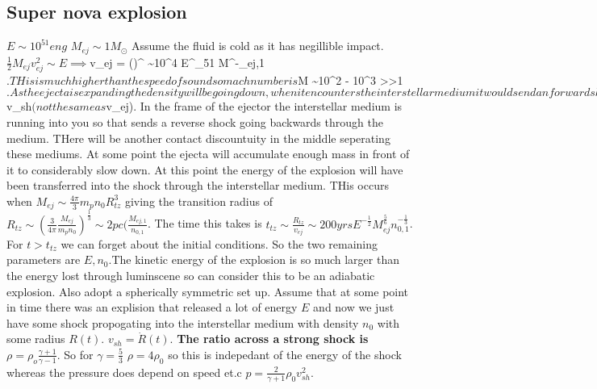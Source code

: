 \documentclass{article}
\begin{document}
        \subsection{Super nova explosion}
        $E \sim 10^{51} eng$ $M_{ej} \sim 1 M_{\odot}$ Assume the fluid is cold as it has negillible impact. $\frac{1}{2} M_{ej} v^2_{ej} \sim E \implies $v_{ej} = ()^{} \sim 10^4  E^{}_{51} M^{-}_{ej,1}$. THis is much higher than the speed of sound so mach number is $M \sim 10^2 - 10^3 >>1$. As the ejecta is expanding the density will be going down, when it encounters the interstellar medium it would send an forward shock into the interstellar medium with some velocity $v_{sh}$ (not the same as $v_{ej}). In the frame of the ejector the interstellar medium is running into you so that sends a reverse shock going backwards through the medium. THere will be another contact discountuity in the middle seperating these mediums. At some point the ejecta will accumulate enough mass in front of it to considerably slow down. At this point the energy of the explosion will have been transferred into the shock through the interstellar medium. THis occurs when $M_{ej} \sim \frac{4\pi}{3} m_p n_0 R^{3}_{tz}$ giving the transition radius of $R_{tz} \sim (\frac{3}{4\pi} \frac{M_{ej}}{m_p n_0})^{\frac{1}{3}} \sim 2 pc (\frac{M_{ej,1}}{n_{0,1}}$. The time this takes is $t_{tz} \sim \frac{R_{tz}}{v_{ej}} \sim 200 yrs E^{-\frac{1}{2}} M_{ej}^{\frac{5}{6}} n_{0,1}^{-\frac{1}{3}}$. For $t > t_{tz}$ we can forget about the initial conditions. So the two remaining parameters are $E, n_0$.The kinetic energy of the explosion is so much larger than the energy lost through luminscene so can consider this to be an adiabatic explosion. Also adopt a spherically symmetric set up. Assume that at some point in time there was an explision that released a lot of energy $E$ and now we just have some shock propogating into the interstellar medium with density $n_0$ with some radius $R(t)$. $v_{sh} = \dot R(t)$. \textbf{The ratio across a strong shock is} $\rho = \rho_o\frac{\gamma +1}{\gamma-1}$. So for $\gamma= \frac{5}{3}$ $\rho = 4 \rho_0$ so this is indepedant of the energy of the shock whereas the pressure does depend on speed et.c $p= \frac{2}{\gamma+1} \rho_0 v^2_{sh}$.
\end{document}
